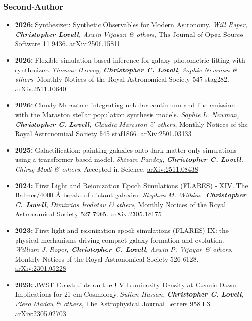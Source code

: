 \subsubsection*{Second-Author}
\begin{itemize}
\item \textbf{2026:} Synthesizer: Synthetic Observables for Modern Astronomy. \textit{Will Roper, \textbf{Christopher Lovell}, Aswin Vijayan \& others}, The Journal of Open Source Software 11 9436. \href{https://arxiv.org/abs/2506.15811}{arXiv:2506.15811}
\item \textbf{2026:} Flexible simulation-based inference for galaxy photometric fitting with synthesizer. \textit{Thomas Harvey, \textbf{Christopher C. Lovell}, Sophie Newman \& others}, Monthly Notices of the Royal Astronomical Society 547 stag282. \href{https://arxiv.org/abs/2511.10640}{arXiv:2511.10640}
\item \textbf{2026:} Cloudy-Maraston: integrating nebular continuum and line emission with the Maraston stellar population synthesis models. \textit{Sophie L. Newman, \textbf{Christopher C. Lovell}, Claudia Maraston \& others}, Monthly Notices of the Royal Astronomical Society 545 staf1866. \href{https://arxiv.org/abs/2501.03133}{arXiv:2501.03133}
\item \textbf{2025:} Galactification: painting galaxies onto dark matter only simulations using a transformer-based model. \textit{Shivam Pandey, \textbf{Christopher C. Lovell}, Chirag Modi \& others}, Accepted in Science. \href{https://arxiv.org/abs/2511.08438}{arXiv:2511.08438}
\item \textbf{2024:} First Light and Reionization Epoch Simulations (FLARES) - XIV. The Balmer/4000 Å breaks of distant galaxies. \textit{Stephen M. Wilkins, \textbf{Christopher C. Lovell}, Dimitrios Irodotou \& others}, Monthly Notices of the Royal Astronomical Society 527 7965. \href{https://arxiv.org/abs/2305.18175}{arXiv:2305.18175}
\item \textbf{2023:} First light and reionization epoch simulations (FLARES) IX: the physical mechanisms driving compact galaxy formation and evolution. \textit{William J. Roper, \textbf{Christopher C. Lovell}, Aswin P. Vijayan \& others}, Monthly Notices of the Royal Astronomical Society 526 6128. \href{https://arxiv.org/abs/2301.05228}{arXiv:2301.05228}
\item \textbf{2023:} JWST Constraints on the UV Luminosity Density at Cosmic Dawn: Implications for 21 cm Cosmology. \textit{Sultan Hassan, \textbf{Christopher C. Lovell}, Piero Madau \& others}, The Astrophysical Journal Letters 958 L3. \href{https://arxiv.org/abs/2305.02703}{arXiv:2305.02703}

\end{itemize}
